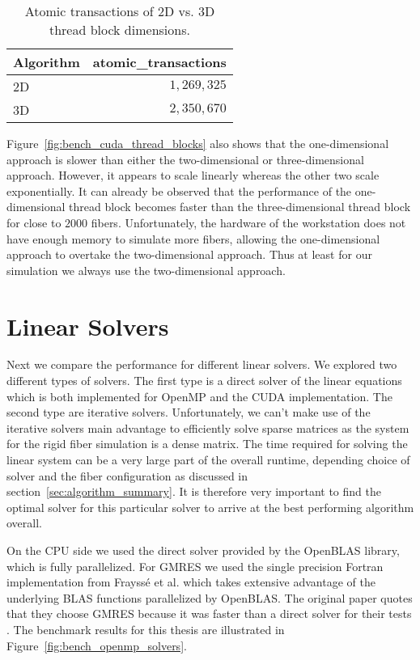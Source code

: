 \begin{table}[!htbp]
  \begin{center}
    \begin{tabulary}{0.7\textwidth}{LR}
      \toprule
      Algorithm & atomic\_transactions \\
      \midrule
      2D & $1,269,325$ \\
      3D & $2,350,670$ \\
      \bottomrule
    \end{tabulary}
  \end{center}
  \caption{Atomic transactions of 2D vs. 3D thread block dimensions.}
  \label{tab:atomic_transactions}
\end{table}

Figure~\ref{fig:bench_cuda_thread_blocks} also shows that the one-dimensional approach is slower than either the two-dimensional or three-dimensional approach. However, it appears to scale linearly whereas the other two scale exponentially. It can already be observed that the performance of the one-dimensional thread block becomes faster than the three-dimensional thread block for close to $2000$ fibers. Unfortunately, the hardware of the workstation does not have enough memory to simulate more fibers, allowing the one-dimensional approach to overtake the two-dimensional approach. Thus at least for our simulation we always use the two-dimensional approach.

\section{Linear Solvers}
\label{sec:bench_linear_solvers}

Next we compare the performance for different linear solvers. We explored two different types of solvers. The first type is a direct solver of the linear equations which is both implemented for OpenMP and the CUDA implementation. The second type are iterative solvers. Unfortunately, we can't make use of the iterative solvers main advantage to efficiently solve sparse matrices as the system for the rigid fiber simulation is a dense matrix. The time required for solving the linear system can be a very large part of the overall runtime, depending choice of solver and the fiber configuration as discussed in section~\ref{sec:algorithm_summary}. It is therefore very important to find the optimal solver for this particular solver to arrive at the best performing algorithm overall.

On the CPU side we used the direct solver provided by the OpenBLAS library, which is fully parallelized. For GMRES we used the single precision Fortran implementation from Frayssé et al. \cite{Fraysse2003} which takes extensive advantage of the underlying BLAS functions parallelized by OpenBLAS. The original paper quotes that they choose GMRES because it was faster than a direct solver for their tests \cite{Tornberg2006}. The benchmark results for this thesis are illustrated in Figure~\ref{fig:bench_openmp_solvers}.

